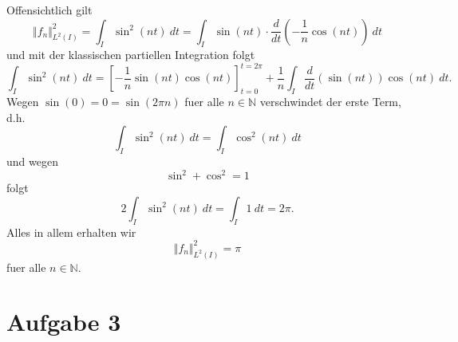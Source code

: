 \documentclass{article}
\begin{document}
Offensichtlich gilt
\begin{equation*}
  \Vert f_n \Vert_{L^2(I)}^2
  = \int_{I} \sin^2(nt) \ dt
  = \int_{I} \sin(nt) \cdot \frac{d}{dt} \left(- \frac{1}{n}  \cos(nt)\right) \ dt
\end{equation*}
und mit der klassischen partiellen Integration folgt
\begin{equation*}
  \int_{I} \sin^2(nt) \ dt
  = \left[- \frac{1}{n} \sin(nt) \cos(nt)\right]_{t=0}^{t= 2\pi}
  + \frac{1}{n} \int_{I} \frac{d}{dt} \left(\sin(nt)\right) \cos(nt) \ dt.
\end{equation*}
Wegen $\sin(0) = 0 = \sin(2 \pi n)$ fuer alle $n \in \mathbb{N}$ verschwindet der erste Term, d.h.\
\begin{equation*}
  \int_{I} \sin^2(nt) \ dt
  = \int_{I}  \cos^2(nt) \ dt
\end{equation*}
und wegen
\begin{equation*}
  \sin^2 + \cos^2 = 1
\end{equation*}
folgt
\begin{equation*}
  2 \int_{I}^{} \sin^2(nt) \ dt
  = \int_{I}^{} 1 \ dt
  = 2 \pi.
\end{equation*}
Alles in allem erhalten wir
\begin{equation*}
  \Vert f_n \Vert_{L^2(I)}^2
  = \pi
\end{equation*}
fuer alle $n \in \mathbb{N}$.

\section*{Aufgabe 3}
\end{document}
